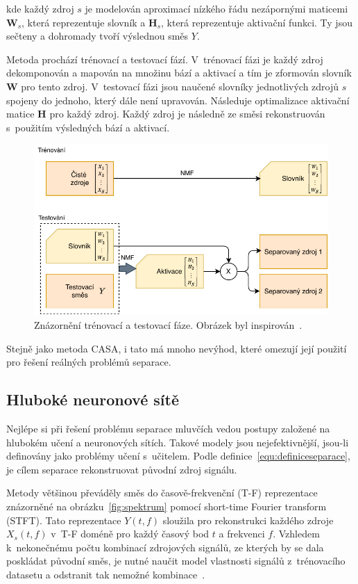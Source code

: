 kde každý zdroj $s$ je modelován aproximací nízkého řádu nezápornými maticemi $\textbf{W}_s$, která reprezentuje slovník a $\textbf{H}_s$, která reprezentuje aktivační funkci. Ty jsou sečteny a dohromady tvoří výslednou směs $Y$.

Metoda prochází trénovací a testovací fází.
V~trénovací fázi je každý zdroj dekomponován a mapován na množinu bází a aktivací a tím je zformován slovník $\textbf{W}$ pro tento zdroj.
V~testovací fázi jsou naučené slovníky jednotlivých zdrojů $s$ spojeny do jednoho, který dále není upravován. Následuje optimalizace aktivační matice $\textbf{H}$ pro každý zdroj. Každý zdroj je následně ze směsi rekonstruován s~použitím výsledných bází a aktivací.

\begin{figure}[H]
    \centering
    \includegraphics[scale=0.9]{obrazky-figures/nmf.pdf}
    \caption{\label{fig:nmf}Znázornění trénovací a testovací fáze. Obrázek byl inspirován~\cite{speechseparation}.}
\end{figure}

Stejně jako metoda CASA, i tato má mnoho nevýhod, které omezují její použití pro řešení reálných problémů separace.



\subsection{Hluboké neuronové sítě}
Nejlépe si při řešení problému separace mluvčích vedou postupy založené na hlubokém učení a neuronových sítích. Takové modely jsou nejefektivnější, jsou-li definovány jako problémy učení s~učitelem. Podle definice~\ref{equ:definiceseparace}, je cílem separace rekonstruovat původní zdroj signálu.

Metody většinou převáděly směs do časově-frekvenční (T-F) reprezentace znázorněné na obrázku~\ref{fig:spektrum} pomocí short-time Fourier transform (STFT). Tato reprezentace $Y(t,f)$ sloužila pro rekonstrukci každého zdroje $X_s(t,f)$ v~T-F doméně pro každý časový bod $t$ a frekvenci $f$. Vzhledem k~nekonečnému počtu kombinací zdrojových signálů, ze kterých by se dala poskládat původní směs, je nutné naučit model vlastnosti signálů z~trénovacího datasetu a odstranit tak nemožné kombinace~\cite{speechseparation}.

